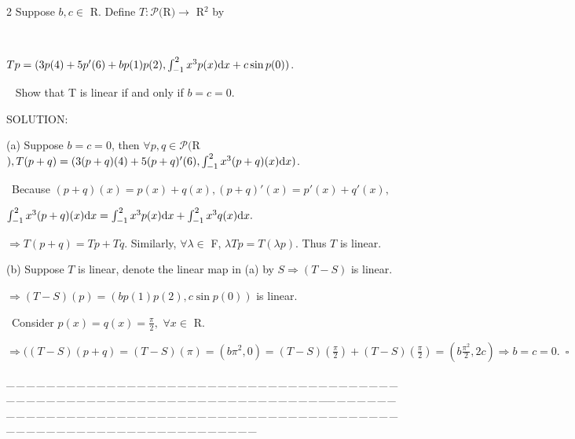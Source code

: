 \documentclass[a4paper, 11pt, UTF8]{article}
\def\d{\textup{d}}
\def\Po{\mathcal{P}}
\begin{document}
\begin{large}
{\timesbf\Large 2} {\timessl\Large 
Suppose $b,c\in$ {\timesbf R}. Define $T:\Po(${\timesbf R}$)\rightarrow$ {\timesbf R}$^2$ by}\par\,\,\,
\centerline{\timessl\Large
$Tp = (3p(4)+5p'(6)+bp(1)p(2), \int_{-1}^2 x^3 p(x)\d x+c \sin p(0))$.}\par\,\,\,
{\timessl\Large
Show that T is linear if and only if $b = c = 0$.
}\par
{\timesbf S\footnotesize{OLUTION:}}\par\quad
(a) Suppose $b=c=0$, then $\forall p,q\in\Po(${\timesbf R}$),T(p+q)=(3(p+q)(4)+5(p+q)'(6),\int_{-1}^2 x^3 (p+q)(x) \d x)$.\par\qquad\,
Because $(p+q)(x)=p(x)+q(x),(p+q)'(x)=p'(x)+q'(x),$\par\qquad\qquad\qquad$\int_{-1}^2 x^3(p+q)(x)\d x=\int_{-1}^2 x^3 p(x)\d x+\int_{-1}^2 x^3 q(x)\d x.$\par\quad
$\Rightarrow T(p+q)=Tp+Tq.$ Similarly, $\forall \lambda\in$ {\timesbf F}, $\lambda Tp=T(\lambda p).$ Thus $T$ is linear.\par\quad
(b) Suppose $T$ is linear, denote the linear map in (a) by $S\Rightarrow (T-S)$ is linear.\par\quad
$\Rightarrow (T-S)(p)=(bp(1)p(2),c\sin p(0))$ is linear.\par\qquad\,
Consider $p(x)=q(x)=\frac{\pi}{2},\,\,\forall x\in$ {\timesbf R}.\par\quad
$\Rightarrow((T-S)(p+q)=(T-S)(\pi)=(b\pi^2,0)=(T-S)(\frac{\pi}{2})+(T-S)(\frac{\pi}{2})=(b\frac{\pi^2}{2}, 2c)\Rightarrow b=c=0.\,\,\,\square$\par
{\tiny \_\,\_\,\_\,\_\,\_\,\_\,\_\,\_\,\_\,\_\,\_\,\_\,\_\,\_\,\_\,\_\,\_\,\_\,\_\,\_\,\_\,\_\,\_\,\_\,\_\,\_\,\_\,\_\,\_\,\_\,\_\,\_\,\_\,\_\,\_\,\_\,\_\,\_\,\_\,\_\,\_\,\_\,\_\,\_\,\_\,\_\,\_\,\_\,\_\,\_\,\_\,\_\,\_\,\_\,\_\,\_\,\_\,\_\,\_\,\_\,\_\,\_\,\_\,\_\,\_\,\_\,\_\,\_\,\_\,\_\,\_\_\,\_\,\_\,\_\,\_\,\_\,\_\,\_\,\_\,\_\,\_\,\_\,\_\,\_\,\_\,\_\,\_\,\_\,\_\,\_\,\_\,\_\,\_\,\_\,\_\,\_\,\_\,\_\,\_\,\_\,\_\,\_\,\_\,\_\,\_\,\_\,\_\,\_\,\_\,\_\,\_\,\_\,\_\,\_\,\_\,\_\,\_\,\_\,\_\,\_\,\_\,\_\,\_\,\_\,\_\,\_\,\_\,\_\,\_\,\_\,\_\,\_\,\_\,\_\,\_\,\_\,\_\,\_\,\_\,\_\,\_}\par



\end{large}
\end{document}
